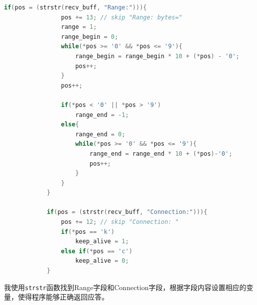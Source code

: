 \documentclass[UTF8]{article}
\begin{document}
\begin{lstlisting}[language=c]
            if(pos = (strstr(recv_buff, "Range:"))){
                pos += 13; // skip "Range: bytes="
                range = 1;
                range_begin = 0;
                while(*pos >= '0' && *pos <= '9'){
                    range_begin = range_begin * 10 + (*pos) - '0';
                    pos++;
                }
                pos++;

                if(*pos < '0' || *pos > '9')
					range_end = -1;
                else{
					range_end = 0;
					while(*pos >= '0' && *pos <= '9'){
						range_end = range_end * 10 + (*pos)-'0';
						pos++;
					}
				}
            }

            if(pos = (strstr(recv_buff, "Connection:"))){
                pos += 12; // skip "Connection: "
                if(*pos == 'k')
                    keep_alive = 1;
                else if(*pos == 'c')
                    keep_alive = 0;
            }
\end{lstlisting}

我使用\texttt{strstr}函数找到Range字段和Connection字段，根据字段内容设置相应的变量，使得程序能够正确返回应答。
\end{document}
